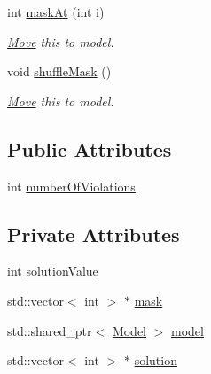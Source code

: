 \begin{DoxyCompactItemize}
\item 
int \hyperlink{class_state_a3f1b234c71d5b092f461cabb3a2dbb62}{mask\-At} (int i)
\begin{DoxyCompactList}\small\item\em \hyperlink{class_move}{Move} this to model. \end{DoxyCompactList}\item 
void \hyperlink{class_state_ab501d958f58c45daaea79337884dee09}{shuffle\-Mask} ()
\begin{DoxyCompactList}\small\item\em \hyperlink{class_move}{Move} this to model. \end{DoxyCompactList}\end{DoxyCompactItemize}
\subsection*{Public Attributes}
\begin{DoxyCompactItemize}
\item 
int \hyperlink{class_state_a1486bf81e466cab8d70d3b550cd4e0f9}{number\-Of\-Violations}
\end{DoxyCompactItemize}
\subsection*{Private Attributes}
\begin{DoxyCompactItemize}
\item 
int \hyperlink{class_state_a1cd5b1a0b71c43d2da0dfff6147f245c}{solution\-Value}
\item 
std\-::vector$<$ int $>$ $\ast$ \hyperlink{class_state_af719cb2cc33bb43091fd40ee0d6b5bf9}{mask}
\item 
std\-::shared\-\_\-ptr$<$ \hyperlink{class_model}{Model} $>$ \hyperlink{class_state_a186c5e2023a2fe5f0587c77e55f122a9}{model}
\item 
std\-::vector$<$ int $>$ $\ast$ \hyperlink{class_state_aa37c4277fe2f3be05931b7a5b8443401}{solution}
\end{DoxyCompactItemize}


